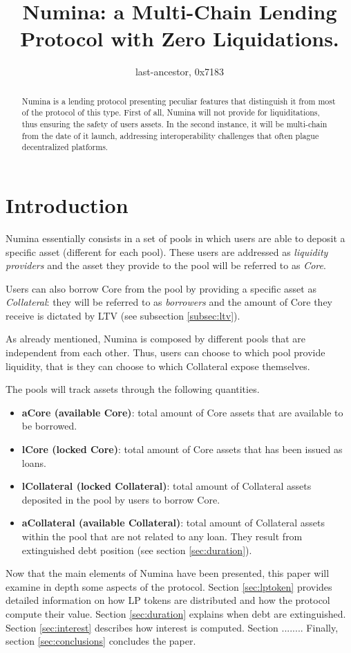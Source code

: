 \documentclass[12pt]{paper}
\title{Numina: a Multi-Chain Lending Protocol with Zero Liquidations.}
\author{last-ancestor, 0x7183}
\date{}
\begin{document}
\maketitle


\begin{abstract}
	Numina is a lending protocol presenting peculiar features that distinguish it from most of the protocol of this type. First of all, Numina will not provide for liquiditations, thus ensuring the safety of users assets. In the second instance, it will be multi-chain from the date of it launch,  addressing interoperability challenges that often plague decentralized platforms.
\end{abstract}
	

\section{Introduction}
\label{sec:introduction}
	Numina essentially consists in a set of pools in which users are able to deposit a specific asset (different for each pool). These users are addressed as \textit{liquidity providers} and the asset they provide to the pool will be referred to as \textit{Core}.
	\par Users can also borrow Core from the pool by providing a specific asset as \textit{Collateral}: they will be referred to as \textit{borrowers} and the amount of Core they receive is dictated by LTV (see subsection \ref{subsec:ltv}).
	\par As already mentioned, Numina is composed by different pools that are independent from each other. Thus, users can choose to which pool provide liquidity, that is they can choose to which Collateral expose themselves.
	\par The pools will track assets through the following quantities.
	\begin{itemize}
		\item \textbf{aCore (available Core)}: total amount of Core assets that are available to be borrowed.
		\item \textbf{lCore (locked Core)}: total amount of Core assets that has been issued as loans.
		\item \textbf{lCollateral (locked Collateral)}: total amount of Collateral assets deposited in the pool by users to borrow Core.
		\item \textbf{aCollateral (available Collateral)}: total amount of Collateral assets within the pool that are not related to any loan. They result from extinguished debt position (see section \ref{sec:duration}).
	\end{itemize} 
	Now that the main elements of Numina have been presented, this paper will examine in depth some aspects of the protocol. Section \ref{sec:lptoken} provides detailed information on how LP tokens are distributed and how the protocol compute their value. Section \ref{sec:duration} explains when debt are extinguished. Section \ref{sec:interest} describes how interest is computed. Section ........ Finally, section \ref{sec:conclusions} concludes the paper. 
	
\end{document}
